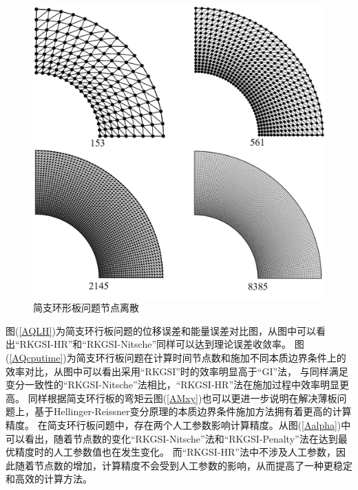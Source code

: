 \begin{figure}[H]
    \centering
    \includegraphics[scale=0.45]{figure/PHR/A/annularmsh.png}
    \caption{简支环形板问题节点离散}\label{annularmsh}
\end{figure}
图(\ref{AQLH})为简支环行板问题的位移误差和能量误差对比图，从图中可以看出“RKGSI-HR”和“RKGSI-Nitsche”同样可以达到理论误差收敛率。
图(\ref{AQcputime})为简支环行板问题在计算时间节点数和施加不同本质边界条件上的效率对比，从图中可以看出采用“RKGSI”时的效率明显高于“GI”法，
与同样满足变分一致性的“RKGSI-Nitsche”法相比，“RKGSI-HR”法在施加过程中效率明显更高。
同样根据简支环行板的弯矩云图(\ref{AMxy})也可以更进一步说明在解决薄板问题上，基于Hellinger-Reissner变分原理的本质边界条件施加方法拥有着更高的计算精度。
在简支环行板问题中，存在两个人工参数影响计算精度。从图(\ref{Aalpha})中可以看出，随着节点数的变化“RKGSI-Nitsche”法和“RKGSI-Penalty”法在达到最优精度时的人工参数值也在发生变化。
而“RKGSI-HR”法中不涉及人工参数，因此随着节点数的增加，计算精度不会受到人工参数的影响，从而提高了一种更稳定和高效的计算方法。

